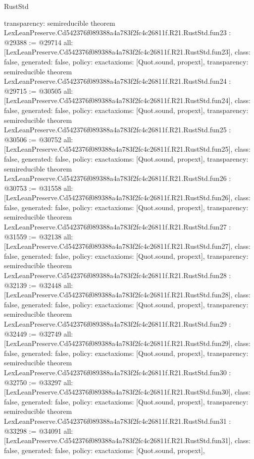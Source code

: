 \begin{lexlean}{RustStd}
\begin{coremodule}
{  transparency: semireducible
}
theorem LexLeanPreserve.Cd542376f089388a4a783f2fc4c26811f.R21.RustStd.fun23 : @29388 := @29714 {
  all: [LexLeanPreserve.Cd542376f089388a4a783f2fc4c26811f.R21.RustStd.fun23],
  class: false,
  generated: false,
  policy: exact{axioms: [Quot.sound, propext]},
  transparency: semireducible
}
theorem LexLeanPreserve.Cd542376f089388a4a783f2fc4c26811f.R21.RustStd.fun24 : @29715 := @30505 {
  all: [LexLeanPreserve.Cd542376f089388a4a783f2fc4c26811f.R21.RustStd.fun24],
  class: false,
  generated: false,
  policy: exact{axioms: [Quot.sound, propext]},
  transparency: semireducible
}
theorem LexLeanPreserve.Cd542376f089388a4a783f2fc4c26811f.R21.RustStd.fun25 : @30506 := @30752 {
  all: [LexLeanPreserve.Cd542376f089388a4a783f2fc4c26811f.R21.RustStd.fun25],
  class: false,
  generated: false,
  policy: exact{axioms: [Quot.sound, propext]},
  transparency: semireducible
}
theorem LexLeanPreserve.Cd542376f089388a4a783f2fc4c26811f.R21.RustStd.fun26 : @30753 := @31558 {
  all: [LexLeanPreserve.Cd542376f089388a4a783f2fc4c26811f.R21.RustStd.fun26],
  class: false,
  generated: false,
  policy: exact{axioms: [Quot.sound, propext]},
  transparency: semireducible
}
theorem LexLeanPreserve.Cd542376f089388a4a783f2fc4c26811f.R21.RustStd.fun27 : @31559 := @32138 {
  all: [LexLeanPreserve.Cd542376f089388a4a783f2fc4c26811f.R21.RustStd.fun27],
  class: false,
  generated: false,
  policy: exact{axioms: [Quot.sound, propext]},
  transparency: semireducible
}
theorem LexLeanPreserve.Cd542376f089388a4a783f2fc4c26811f.R21.RustStd.fun28 : @32139 := @32448 {
  all: [LexLeanPreserve.Cd542376f089388a4a783f2fc4c26811f.R21.RustStd.fun28],
  class: false,
  generated: false,
  policy: exact{axioms: [Quot.sound, propext]},
  transparency: semireducible
}
theorem LexLeanPreserve.Cd542376f089388a4a783f2fc4c26811f.R21.RustStd.fun29 : @32449 := @32749 {
  all: [LexLeanPreserve.Cd542376f089388a4a783f2fc4c26811f.R21.RustStd.fun29],
  class: false,
  generated: false,
  policy: exact{axioms: [Quot.sound, propext]},
  transparency: semireducible
}
theorem LexLeanPreserve.Cd542376f089388a4a783f2fc4c26811f.R21.RustStd.fun30 : @32750 := @33297 {
  all: [LexLeanPreserve.Cd542376f089388a4a783f2fc4c26811f.R21.RustStd.fun30],
  class: false,
  generated: false,
  policy: exact{axioms: [Quot.sound, propext]},
  transparency: semireducible
}
theorem LexLeanPreserve.Cd542376f089388a4a783f2fc4c26811f.R21.RustStd.fun31 : @33298 := @34091 {
  all: [LexLeanPreserve.Cd542376f089388a4a783f2fc4c26811f.R21.RustStd.fun31],
  class: false,
  generated: false,
  policy: exact{axioms: [Quot.sound, propext]},
}
\end{coremodule}
\end{lexlean}
